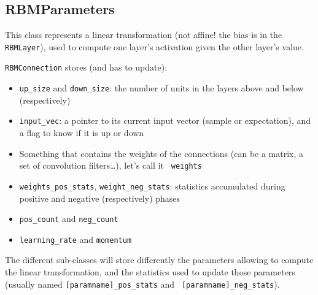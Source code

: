 \documentclass[11pt]{book}
\begin{document}
\subsection{RBMParameters}

This class represents a linear transformation (not affine! the bias is
in the {\tt RBMLayer}), used to compute one layer's activation given the
other layer's value.

{\tt RBMConnection} stores (and has to update):
\begin{itemize}

    \item {\tt up\_size} and {\tt down\_size}: the number of units in
    the layers above and below (respectively)

    \item {\tt input\_vec}: a pointer to its current input vector
    (sample or expectation), and a flag to know if it is up or down

    \item Something that contains the weights of the connections (can be
    a matrix, a set of convolution filters\ldots), let's call it {\tt
    weights}

    \item {\tt weights\_pos\_stats}, {\tt weight\_neg\_stats}:
    statistics accumulated during positive and negative (respectively)
    phases

    \item {\tt pos\_count} and {\tt neg\_count}

    \item {\tt learning\_rate} and {\tt momentum}

\end{itemize}

The different sub-classes will store differently the parameters allowing
to compute the linear transformation, and the statistics used to update
those parameters (usually named {\tt [paramname]\_pos\_stats} and {\tt
[paramname]\_neg\_stats}).
\end{document}
